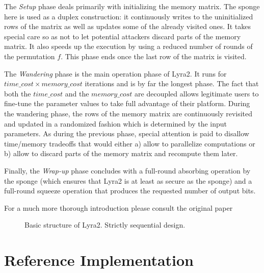 The \emph{Setup} phase deals primarily with initializing the memory matrix. The sponge here is used as a duplex construction: it continuously writes to the uninitialized rows of the matrix as well as updates some of the already visited ones. It takes special care so as not to let potential attackers discard parts of the memory matrix. It also speeds up the execution by using a reduced number of rounds of the permutation \(f\). This phase ends once the last row of the matrix is visited.

The \emph{Wandering} phase is the main operation phase of Lyra2. It runs for \(time\_cost \times memory\_cost\) iterations and is by far the longest phase. The fact that both the \(time\_cost\) and the \(memory\_cost\) are decoupled allows legitimate users to fine-tune the parameter values to take full advantage of their platform. During the wandering phase, the rows of the memory matrix are continuously revisited and updated in a randomized fashion which is determined by the input parameters. As during the previous phase, special attention is paid to disallow time/memory tradeoffs that would either a) allow to parallelize computations or b) allow to discard parts of the memory matrix and recompute them later.

Finally, the \emph{Wrap-up} phase concludes with a full-round absorbing operation by the sponge (which ensures that Lyra2 is at least as secure as the sponge) and a full-round squeeze operation that produces the requested number of output bits.

For a much more thorough introduction please consult the original paper \cite{andrade:2016:lyra2,marcos:2015:lyra2}

\begin{figure}[H]
\centering
  \caption{Basic structure of Lyra2. Strictly sequential design.}
  \label{fig:basic-structure-lyra2}
\end{figure}

\section{Reference Implementation}
\label{sec:reference-implementation}

